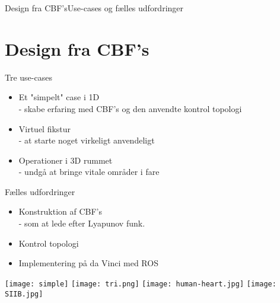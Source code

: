 \begin{frame}{Design fra CBF's}{Use-cases og fælles udfordringer}
\section{Design fra CBF's}
\begin{minipage}{0.5\textwidth}
	\begin{block}{Tre use-cases}
		\begin{itemize}
			\item Et "simpelt" case i 1D \\ \scriptsize{ - skabe erfaring med CBF's og den anvendte kontrol topologi}
			\item  \normalsize Virtuel fikstur \\ \scriptsize - at starte noget virkeligt anvendeligt
			\item \normalsize  Operationer i 3D rummet \\  \scriptsize - undgå at bringe vitale områder i fare
		\end{itemize}
	\end{block}
	\begin{block}{Fælles udfordringer}%
		\begin{itemize}
			\item Konstruktion af CBF's \\ \scriptsize - som at lede efter Lyapunov funk.
			\item \normalsize Kontrol topologi
			\item Implementering på da Vinci med ROS
		\end{itemize}
	\end{block}
\end{minipage}
\hspace{0.3cm}
\begin{minipage}{0.45\textwidth}
\texttt{[image: simple]}
\texttt{[image: tri.png]}
\vspace{0.2cm}
\texttt{[image: human-heart.jpg]}
\vspace{0.2cm}
\texttt{[image: SIIB.jpg]}
\vspace{0.2cm}
\end{minipage}
\end{frame}

